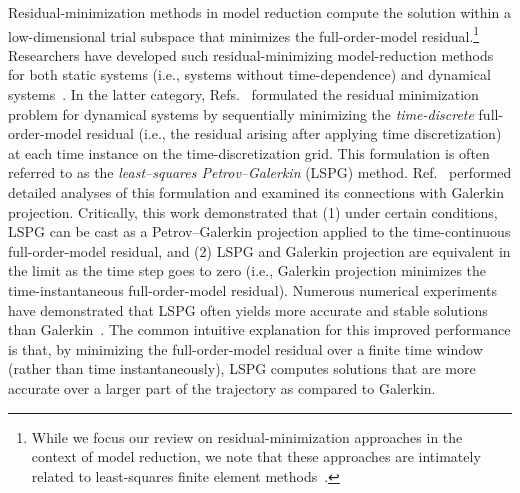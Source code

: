 \documentclass[3p,computermodern,10pt]{elsarticle}
\begin{document}
Residual-minimization methods in model reduction compute the solution within a
low-dimensional trial subspace that minimizes the full-order-model residual.\footnote{While we focus our review on residual-minimization approaches in the context of model reduction, we note that these approaches are intimately related to least-squares finite element methods~\cite{bochev_leastsquares,bochev_lsfem_book}.}
Researchers have developed such residual-minimizing model-reduction methods
for both static systems (i.e., systems without time-dependence)
\cite{legresley_1,legresley_2,legresley_3,bui_resmin_steady,rovas_thesis,carlberg_thesis,bui_thesis}
and dynamical
systems~\cite{bui_thesis,bui_unsteady,carlberg_thesis,carlberg_gnat,carlberg_lspg,carlberg_lspg_v_galerkin}.
In the latter category,
Refs.~\cite{bui_thesis,bui_unsteady,carlberg_thesis,carlberg_gnat,carlberg_lspg}
formulated the residual minimization problem for dynamical systems by
sequentially minimizing the \textit{time-discrete} full-order-model residual
(i.e., the residual arising after applying time discretization) at each time
instance on the time-discretization grid. This formulation is often referred
to as the \textit{least--squares Petrov--Galerkin} (LSPG) method.
Ref.~\cite{carlberg_lspg_v_galerkin} performed detailed analyses of this
formulation and examined its connections with Galerkin projection. Critically,
this work demonstrated that (1) under certain conditions, LSPG can be cast as a 
Petrov--Galerkin projection applied to the time-continuous
full-order-model residual, and (2) LSPG and Galerkin projection are equivalent
in the limit as the time step goes to zero (i.e., Galerkin projection 
minimizes the time-instantaneous full-order-model residual). Numerous
numerical experiments have demonstrated that LSPG often yields more
accurate and stable solutions than Galerkin~\cite{bui_thesis,carlberg_lspg_v_galerkin,carlberg_gnat,carlberg_thesis,parish_apg}.
The common intuitive explanation for this improved performance is that, by
minimizing the full-order-model residual over a finite time window (rather
than time instantaneously), LSPG computes solutions that are more
accurate over a larger part of the trajectory as compared to Galerkin.
\end{document}
